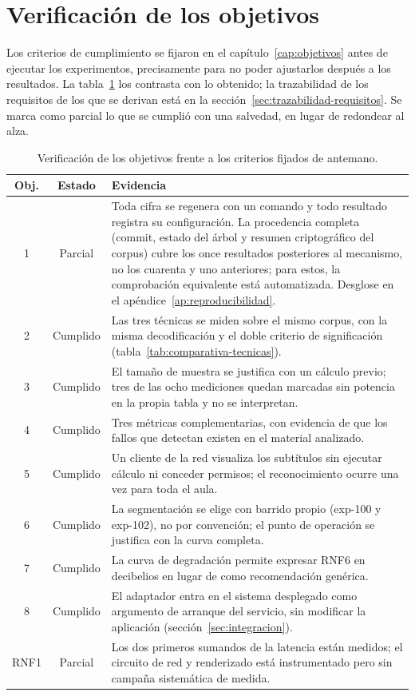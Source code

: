 \section{Verificación de los objetivos}

Los criterios de cumplimiento se fijaron en el capítulo~\ref{cap:objetivos} antes de ejecutar
los experimentos, precisamente para no poder ajustarlos después a los resultados. La
tabla~\ref{tab:verificacion} los contrasta con lo obtenido; la trazabilidad de los requisitos
de los que se derivan está en la sección~\ref{sec:trazabilidad-requisitos}. Se marca como parcial lo que se
cumplió con una salvedad, en lugar de redondear al alza.

\begin{table}[h]
\centering
\footnotesize
\setlength{\tabcolsep}{4pt}
\begin{tabular}{|c|c|p{9.2cm}|}
\hline
\textbf{Obj.} & \textbf{Estado} & \textbf{Evidencia} \\
\hline
1 & Parcial & Toda cifra se regenera con un comando y todo resultado registra su
    configuración. La procedencia completa (commit, estado del árbol y resumen
    criptográfico del corpus) cubre los once resultados posteriores al mecanismo, no los
    cuarenta y uno anteriores; para estos, la comprobación equivalente está automatizada.
    Desglose en el apéndice~\ref{ap:reproducibilidad}. \\
\hline
2 & Cumplido & Las tres técnicas se miden sobre el mismo corpus, con la misma decodificación
    y el doble criterio de significación (tabla~\ref{tab:comparativa-tecnicas}). \\
\hline
3 & Cumplido & El tamaño de muestra se justifica con un cálculo previo; tres de las ocho
    mediciones quedan marcadas sin potencia en la propia tabla y no se interpretan. \\
\hline
4 & Cumplido & Tres métricas complementarias, con evidencia de que los fallos que detectan
    existen en el material analizado. \\
\hline
5 & Cumplido & Un cliente de la red visualiza los subtítulos sin ejecutar cálculo ni
    conceder permisos; el reconocimiento ocurre una vez para toda el aula. \\
\hline
6 & Cumplido & La segmentación se elige con barrido propio (exp-100 y exp-102), no por
    convención; el punto de operación se justifica con la curva completa. \\
\hline
7 & Cumplido & La curva de degradación permite expresar RNF6 en decibelios en lugar de como
    recomendación genérica. \\
\hline
8 & Cumplido & El adaptador entra en el sistema desplegado como argumento de arranque del
    servicio, sin modificar la aplicación (sección~\ref{sec:integracion}). \\
\hline
RNF1 & Parcial & Los dos primeros sumandos de la latencia están medidos; el circuito de red
    y renderizado está instrumentado pero sin campaña sistemática de medida. \\
\hline
\end{tabular}
\caption{Verificación de los objetivos frente a los criterios fijados de antemano.}
\label{tab:verificacion}
\end{table}

